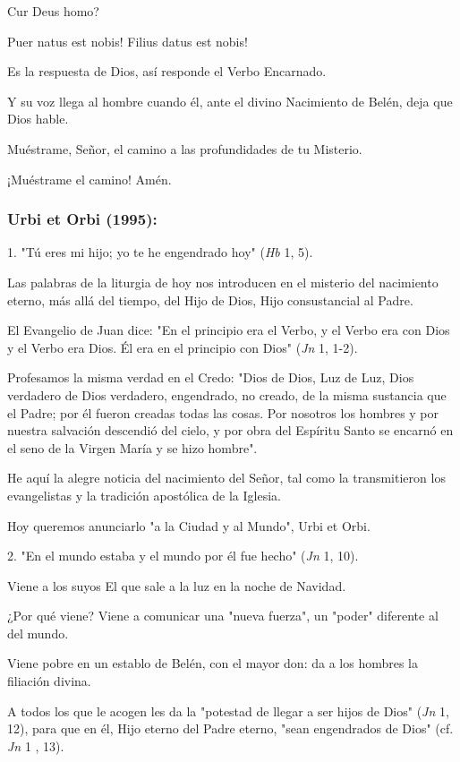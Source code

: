 Cur Deus homo?

Puer natus est nobis! Filius datus est nobis!

Es la respuesta de Dios, así responde el Verbo Encarnado.

Y su voz llega al hombre cuando él, ante el divino Nacimiento de Belén,
deja que Dios hable.

Muéstrame, Señor, el camino a las profundidades de tu Misterio.

¡Muéstrame el camino! Amén.

\subsubsection{Urbi et Orbi (1995): }

1. "Tú eres mi hijo; yo te he engendrado hoy" (\emph{Hb} 1, 5).

Las palabras de la liturgia de hoy nos introducen en el misterio del
nacimiento eterno, más allá del tiempo, del Hijo de Dios, Hijo
consustancial al Padre.

El Evangelio de Juan dice: "En el principio era el Verbo, y el Verbo era
con Dios y el Verbo era Dios. Él era en el principio con Dios"
(\emph{Jn} 1, 1-2).

Profesamos la misma verdad en el Credo: "Dios de Dios, Luz de Luz, Dios
verdadero de Dios verdadero, engendrado, no creado, de la misma
sustancia que el Padre; por él fueron creadas todas las cosas. Por
nosotros los hombres y por nuestra salvación descendió del cielo, y por
obra del Espíritu Santo se encarnó en el seno de la Virgen María y se
hizo hombre".

He aquí la alegre noticia del nacimiento del Señor, tal como la
transmitieron los evangelistas y la tradición apostólica de la Iglesia.

Hoy queremos anunciarlo "a la Ciudad y al Mundo", Urbi et Orbi.

2. "En el mundo estaba y el mundo por él fue hecho" (\emph{Jn} 1, 10).

Viene a los suyos El que sale a la luz en la noche de Navidad.

¿Por qué viene? Viene a comunicar una "nueva fuerza", un "poder"
diferente al del mundo.

Viene pobre en un establo de Belén, con el mayor don: da a los hombres
la filiación divina.

A todos los que le acogen les da la "potestad de llegar a ser hijos de
Dios" (\emph{Jn} 1, 12), para que en él, Hijo eterno del Padre eterno,
"sean engendrados de Dios" (cf. \emph{Jn} 1 , 13).

